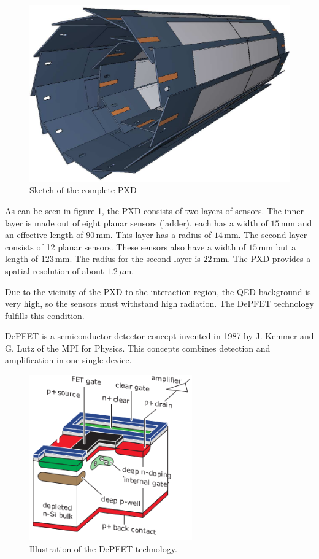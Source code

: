 \documentclass[a4paper,11pt,twosided,final,german,openbib,pdftex,listof=totoc,bibliography=totoc]{scrbook}
\begin{document}
\begin{figure}[h!]
	\begin{center}
		\includegraphics[width=12cm]{Bilder/pixel}
	\end{center}
	\caption[Pixel Detector]{Sketch of the complete PXD \cite{B2TR}}
	\label{fig:pxd}
\end{figure}

As can be seen in figure \ref{fig:pxd}, the PXD consists of two layers of sensors. The inner layer is made out of eight planar sensors (ladder), each has a width of $15\,\textrm{mm}$ and an effective length of $90\,\textrm{mm}$. This layer has a radius of $14\,\textrm{mm}$. The second layer consists of 12 planar sensors. These sensors also have a width of $15\,\textrm{mm}$ but a length of $123\,\textrm{mm}$. The radius for the second layer is $22\,\textrm{mm}$. The PXD provides a spatial resolution of about $1.2\,\mu\textrm{m}$.\cite{B2TR}

Due to the vicinity of the PXD to the interaction region, the QED background is very high, so the sensors must withstand high radiation. The DePFET technology fulfills this condition. \cite{B2TR} \cite{MARINAS201159}
\newline 

DePFET is a semiconductor detector concept invented in 1987 by J. Kemmer and G. Lutz of the MPI for Physics. This concepts combines detection and amplification in one single device. \cite{B2TR}

\begin{figure}[h!]
	\begin{center}
		\includegraphics[width=7cm]{Bilder/DEPFET}
	\end{center}
\caption[DePFET]{Illustration of the DePFET technology.\cite{B2TR}}
\label{fig:DePFET}
\end{figure}
\end{document}
